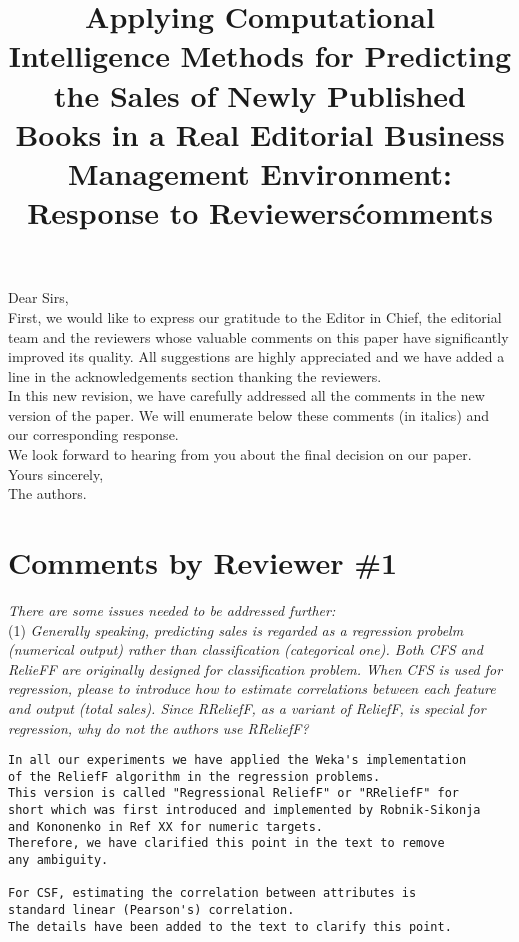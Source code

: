 \documentclass[preprint]{elsarticle}
\begin{document}

\title{Applying Computational Intelligence Methods for Predicting the Sales of Newly Published Books in a Real Editorial Business Management Environment: Response to Reviewers\' comments}

\noindent
Dear Sirs,\\

First, we would like to express our gratitude to the Editor in Chief,
the editorial team and the reviewers whose valuable comments on this
paper have significantly improved its quality. All suggestions are
highly appreciated and we have added a line in the acknowledgements
section thanking the reviewers. \\ 

In this new revision, we have carefully addressed all the comments in
the new version of the paper. We will enumerate below these comments
(in italics) and our corresponding response. \\ 

We look forward to hearing from you about the final decision on our paper. \\

\noindent
Yours sincerely,\\
The authors.

\section{Comments by Reviewer \#1}

\noindent \emph{There are some issues needed to be addressed further:} \\

\noindent (1) \emph{Generally speaking, predicting sales is regarded as a regression probelm (numerical output) rather than classification (categorical one). Both CFS and RelieFF are originally designed for classification problem. When CFS is used for regression, please to introduce how to estimate correlations between each feature and output (total sales). Since RReliefF, as a variant of ReliefF, is special for regression, why do not the authors use RReliefF? } 

\begin{verbatim}
In all our experiments we have applied the Weka's implementation 
of the ReliefF algorithm in the regression problems. 
This version is called "Regressional ReliefF" or "RReliefF" for 
short which was first introduced and implemented by Robnik-Sikonja 
and Kononenko in Ref XX for numeric targets. 
Therefore, we have clarified this point in the text to remove 
any ambiguity.

For CSF, estimating the correlation between attributes is 
standard linear (Pearson's) correlation.
The details have been added to the text to clarify this point.
\end{verbatim}
\end{document}
